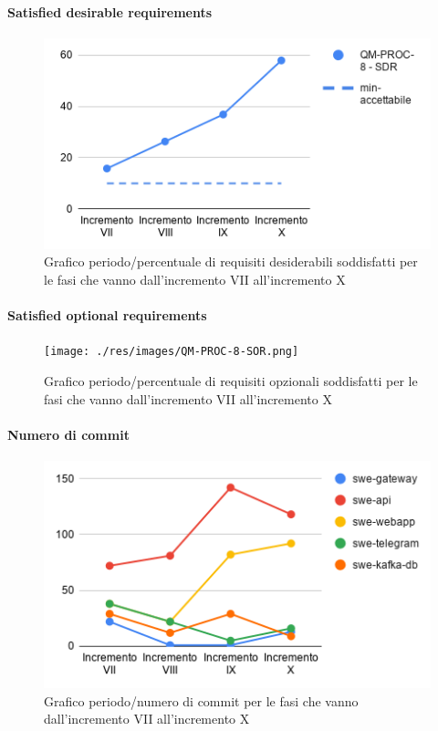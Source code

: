 \paragraph{Satisfied desirable requirements}
	\begin{figure}[H]
			\centering
			\includegraphics[width=0.8\linewidth]{./res/images/QM-PROC-8-SDR.png}
			\caption{Grafico periodo/percentuale di requisiti desiderabili soddisfatti per le fasi che vanno dall'incremento VII all'incremento X}
			\label{fig:Grafico periodo/percentuale di requisiti desiderabili soddisfatti per le fasi che vanno dall'incremento VII all'incremento X}
	\end{figure}
\paragraph{Satisfied optional requirements}
	\begin{figure}[H]
			\centering
			\texttt{[image: ./res/images/QM-PROC-8-SOR.png]}
			\caption{Grafico periodo/percentuale di requisiti opzionali soddisfatti per le fasi che vanno dall'incremento VII all'incremento X}
			\label{fig:Grafico periodo/percentuale di requisiti opzionali soddisfatti per le fasi che vanno dall'incremento VII all'incremento X}
	\end{figure}
\paragraph{Numero di commit}
\begin{figure}[H]
			\centering
			\includegraphics[width=0.8\linewidth]{./res/images/QM-PROC-10-NCOM.png}
			\caption{Grafico periodo/numero di commit per le fasi che vanno dall'incremento VII all'incremento X}
			\label{fig:Grafico periodo/numero di commit per le fasi che vanno dall'incremento VII all'incremento X}
	\end{figure}

